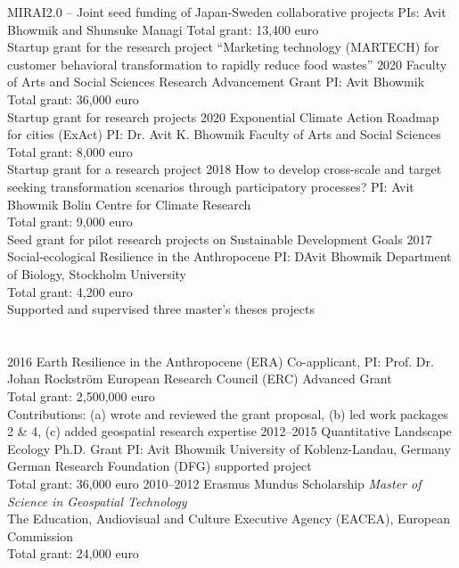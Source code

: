 \documentclass[]{friggeri-cv} %
\begin{document}
\begin{entrylist}
{MIRAI2.0 – Joint seed funding of Japan-Sweden collaborative projects}
{PIs: Avit Bhowmik and Shunsuke Managi}
{Total grant: 13,400 euro\\
Startup grant for the research project ``Marketing technology (MARTECH) for customer behavioral transformation to rapidly reduce food wastes''}
\entry
{\small{2020}}
{Faculty of Arts and Social Sciences Research Advancement Grant}
{PI: Avit Bhowmik}
{Total grant: 36,000 euro\\
Startup grant for research projects}
\entry
{\small{2020}}
{Exponential Climate Action Roadmap for cities (ExAct)}
{PI: Dr. Avit K. Bhowmik}
{Faculty of Arts and Social Sciences\\
Total grant: 8,000 euro\\
Startup grant for a research project}
\entry
{\small{2018}}
{How to develop cross-scale and target seeking transformation scenarios through participatory processes?}
{PI: Avit Bhowmik}
{Bolin Centre for Climate Research\\
Total grant: 9,000 euro\\
Seed grant for pilot research projects on Sustainable Development Goals}
\entry
{\small{2017}}
{Social-ecological Resilience in the Anthropocene}
{PI: DAvit Bhowmik}
{Department of Biology, Stockholm University\\
Total grant: 4,200 euro\\
Supported and supervised three master's theses projects}
\end{entrylist}
\section{}
\begin{entrylist}
\entry
{\small{2016}}
{Earth Resilience in the Anthropocene (ERA)}
{Co-applicant, PI: Prof. Dr. Johan Rockström}
{European Research Council (ERC) Advanced Grant\\
Total grant: 2,500,000 euro\\
Contributions: (a) wrote and reviewed the grant proposal, (b) led work packages 2 \& 4, (c) added geospatial research expertise}
\entry
{\small{2012--2015}}
{Quantitative Landscape Ecology Ph.D. Grant}
{PI: Avit Bhowmik}
{University of Koblenz-Landau, Germany\\
German Research Foundation (DFG) supported project\\
Total grant: 36,000 euro}
\entry
{\small{2010--2012}}
{Erasmus Mundus Scholarship}
{}
{{\emph{Master of Science in Geospatial Technology}} \\
The Education, Audiovisual and Culture Executive Agency (EACEA), European Commission\\
Total grant: 24,000 euro}
\end{entrylist}
\end{document}
